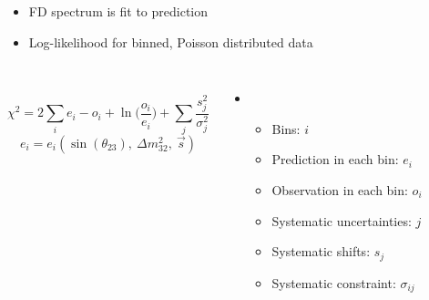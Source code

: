\documentclass[10pt,professionalfonts,xcolor=table]{beamer}
\begin{document}
\begin{frame}
\begin{itemize}
\item FD spectrum is fit to prediction
\item Log-likelihood for binned, Poisson distributed data
\end{itemize}
\begin{columns}[c]
~
\vspace{-5pt}
\begin{equation*}
\chi^2 = 2 \sum_i e_i - o_i + \ln \big (\frac{o_i}{e_i} \big)
+ \sum_j \frac{s_j^2}{\sigma_j^2}
\end{equation*}
\vspace{-5pt}
\begin{equation*}
e_i = e_i(\sin(\theta_{23}), ~\Delta m_{32}^2,~\vec{s} )
\end{equation*}
  \begin{itemize}
  \item[] ~
  \vspace{-15pt}
  \begin{itemize}
  \item Bins: $i$
  \item Prediction in each bin: $e_i$
  \item Observation in each bin: $o_i$
  \item Systematic uncertainties: $j$
  \item Systematic shifts: $s_j$
  \item Systematic constraint: $\sigma_{ij}$
  \end{itemize}
  \end{itemize}
\end{columns}
\end{frame}
\end{document}
